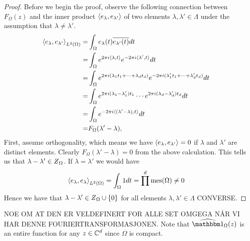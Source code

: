 \documentclass[../thesis.tex]{subfiles}
\begin{document}
\begin{proof}
    Before we begin the proof, observe the following connection between $F_{\Omega}(z)$ and the inner product $\left \langle e_{\lambda},e_{\lambda'}  \right \rangle$ of two elements $\lambda,\lambda'\in \Lambda$ under the assumption that $\lambda \neq \lambda'$.
    \begin{align*}
        \left \langle e_{\lambda},e_{\lambda'}  \right \rangle_{L^2(\Omega)} =& \int_{\Omega} e_{\lambda}(t)\overline{e_{\lambda'}(t)} dt\\
        =& \int_{\Omega} e^{2\pi i \langle\lambda,t\rangle} e^{-2 \pi i \langle\lambda',t\rangle} dt\\
        =& \int_{\Omega} e^{2\pi i  (\lambda_1t_1 + \dots +\lambda_d t_d)} e^{-2\pi i  (\lambda_1' t_1 + \dots +\lambda_d' t_d)} dt\\
        =& \int_{\Omega} e^{2\pi i  (\lambda_1 -\lambda_1')t_1} \cdots e^{2\pi i  (\lambda_d -\lambda_d')t_d} dt\\
        =&\int_{\Omega} e^{-2 \pi i \langle(\lambda'-\lambda),t\rangle} dt\\
        =& F_{\Omega} (\lambda'-\lambda),
    \end{align*}
    First, assume orthogonality, which means we have $\left \langle e_{\lambda},e_{\lambda'}  \right \rangle = 0 $ if $\lambda$ and $\lambda'$ are distinct elements. Clearly $F_{\Omega}(\lambda'-\lambda) = 0$ from the above calculation. This tells us that $\lambda-\lambda'\in \Zstroke_{\Omega}$. If $\lambda = \lambda'$ we would have 
    \begin{equation*}
        \left \langle e_{\lambda},e_{\lambda}  \right \rangle_{L^2(\Omega)} = \int_{\Omega} 1 dt = \prod^d \operatorname{mes}(\Omega) \neq 0
    \end{equation*}
    Hence we have that $\lambda-\lambda' \in \Zstroke_{\Omega} \cup \braq{0}$ for all elements $\lambda,\lambda'\in \Lambda$
    CONVERSE. 
    
\end{proof}


NOE OM AT DEN ER VELDEFINERT FOR ALLE SET OMGEGA NÅR VI HAR DENNE FOURIERTRANSFORMASJONEN.
Note that $\indicatorFourier{\Omega}{z}$ is an entire function for any $z\in \mathbb{C}^d$ since $\Omega$ is compact. %
\end{document}
